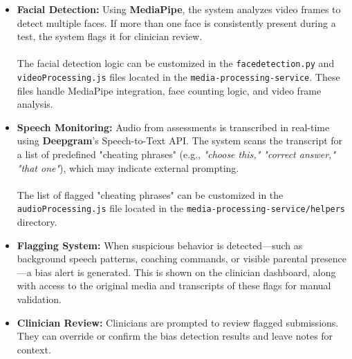 \documentclass{article}
\begin{document}
\begin{itemize}
    \item \textbf{Facial Detection:} Using \textbf{MediaPipe}, the system analyzes video frames to detect multiple faces. If more than one face is consistently present during a test, the system flags it for clinician review. \\\\
    The facial detection logic can be customized in the \texttt{facedetection.py} and \texttt{videoProcessing.js} files located in the \texttt{media-processing-service}. These files handle MediaPipe integration, face counting logic, and video frame analysis.

    \item \textbf{Speech Monitoring:} Audio from assessments is transcribed in real-time using \textbf{Deepgram}'s Speech-to-Text API. The system scans the transcript for a list of predefined "cheating phrases" 
    (e.g., \textit{"choose this," "correct answer," "that one"}), which may indicate external prompting. \\\\
    The list of flagged "cheating phrases" can be customized in the \texttt{audioProcessing.js} file located in the \texttt{media-processing-service/helpers} directory.

    \item \textbf{Flagging System:} When suspicious behavior is detected—such as background speech patterns, coaching commands, or visible parental presence—a bias alert is generated. This is shown on the clinician dashboard, along with access to the original media 
    and transcripts of these flags for manual validation.

    \item \textbf{Clinician Review:} Clinicians are prompted to review flagged submissions. They can override or confirm the bias detection results and leave notes for context.
\end{itemize}
\end{document}
